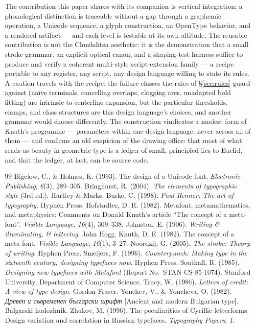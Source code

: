 \documentclass[12pt]{article}
\begin{document}
The contribution this paper shares with its companion is vertical integration: a phonological distinction is traceable without a gap through a graphemic operation, a Unicode sequence, a glyph construction, an OpenType behavior, and a rendered artifact — and each level is testable at its own altitude. The reusable contribution is not the Chuzhditsa aesthetic: it is the demonstration that a small stroke grammar, an explicit optical canon, and a shaping-test harness suffice to produce and verify a coherent multi-style script-extension family — a recipe portable to any register, any script, any design language willing to state its rules. A caution travels with the recipe: the failure classes the rules of \S\ref{sec:rules} guard against (naïve terminals, cancelling overlaps, clogging arcs, unadapted bold fitting) are intrinsic to centerline expansion, but the particular thresholds, clamps, and class structures are this design language's choices, and another grammar would choose differently. The construction vindicates a modest form of Knuth's programme — parameters within one design language, never across all of them — and confirms an old suspicion of the drawing office: that most of what reads as beauty in geometric type is a ledger of small, principled lies to Euclid, and that the ledger, at last, can be source code.

\begin{thebibliography}{99}
 Bigelow, C., \& Holmes, K. (1993). The design of a Unicode font. \emph{Electronic Publishing}, \emph{6}(3), 289--305.
 Bringhurst, R. (2004). \emph{The elements of typographic style} (3rd ed.). Hartley \& Marks.
 Burke, C. (1998). \emph{Paul Renner: The art of typography}. Hyphen Press.
 Hofstadter, D. R. (1982). Metafont, metamathematics, and metaphysics: Comments on Donald Knuth's article ``The concept of a meta-font''. \emph{Visible Language}, \emph{16}(4), 309--338.
 Johnston, E. (1906). \emph{Writing \& illuminating, \& lettering}. John Hogg.
 Knuth, D. E. (1982). The concept of a meta-font. \emph{Visible Language}, \emph{16}(1), 3--27.
 Noordzij, G. (2005). \emph{The stroke: Theory of writing}. Hyphen Press.
 Smeijers, F. (1996). \emph{Counterpunch: Making type in the sixteenth century, designing typefaces now}. Hyphen Press.
 Southall, R. (1985). \emph{Designing new typefaces with Metafont} (Report No.\ STAN-CS-85-1074). Stanford University, Department of Computer Science.
 Tracy, W. (1986). \emph{Letters of credit: A view of type design}. Gordon Fraser.
 Yonchev, V., \& Yoncheva, O. (1982). \emph{Древен и съвременен български шрифт} [Ancient and modern Bulgarian type]. Balgarski hudozhnik.
 Zhukov, M. (1996). The peculiarities of Cyrillic letterforms: Design variation and correlation in Russian typefaces. \emph{Typography Papers}, \emph{1}.
\end{thebibliography}
\end{document}
